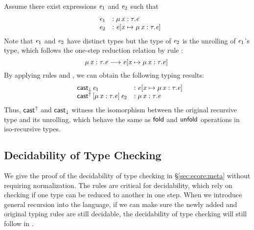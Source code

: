 Assume there exist expressions $\mathit{e_{{\mathrm{1}}}}$ and $\mathit{e_{{\mathrm{2}}}}$ such that 
\[\begin{array}{lll}
	&\mathit{e_{{\mathrm{1}}}} &: \mu \, \mathit{x}  :  \tau  .  \mathit{e}\\
	&\mathit{e_{{\mathrm{2}}}} &: \mathit{e}  [  \mathit{x}  \mapsto  \mu \, \mathit{x}  :  \tau  .  \mathit{e}  ] \,
\end{array}\]
Note that $\mathit{e_{{\mathrm{1}}}}$ and $\mathit{e_{{\mathrm{2}}}}$ have distinct types but the type of $\mathit{e_{{\mathrm{2}}}}$ is the unrolling of $\mathit{e_{{\mathrm{1}}}}$'s type, which follows the one-step reduction relation by rule :
\[ \mu \, \mathit{x}  :  \tau  .  \mathit{e}  \longrightarrow  \mathit{e}  [  \mathit{x}  \mapsto  \mu \, \mathit{x}  :  \tau  .  \mathit{e}  ] \, \]
By applying rules  and , we can obtain the following typing results:
\[\begin{array}{lll}
	&\mathsf{cast}_{\downarrow} \, \mathit{e_{{\mathrm{1}}}} &: \mathit{e}  [  \mathit{x}  \mapsto  \mu \, \mathit{x}  :  \tau  .  \mathit{e}  ] \,\\
	&\mathsf{cast}^{\uparrow} \, [  \mu \, \mathit{x}  :  \tau  .  \mathit{e}  ] \,  \mathit{e_{{\mathrm{2}}}} &: \mu \, \mathit{x}  :  \tau  .  \mathit{e}
\end{array}\]
Thus, $ \mathsf{cast}^{\uparrow} $ and $ \mathsf{cast}_{\downarrow} $ witness the isomorphism between the original recursive type and its unrolling, which behave the same as $\mathsf{fold}$ and $\mathsf{unfold}$ operations in iso-recursive types.

\subsection{Decidability of Type Checking}
We give the proof of the decidability of type checking \ecore in \S \ref{sec:ecore:meta} without requiring normalization. The \cast rules are critical for decidability, which rely on checking if one type can be reduced to another in one step. When we introduce general recursion into the language, if we can make sure the newly added and original typing rules are still decidable, the decidability of type checking will still follow in \name.

